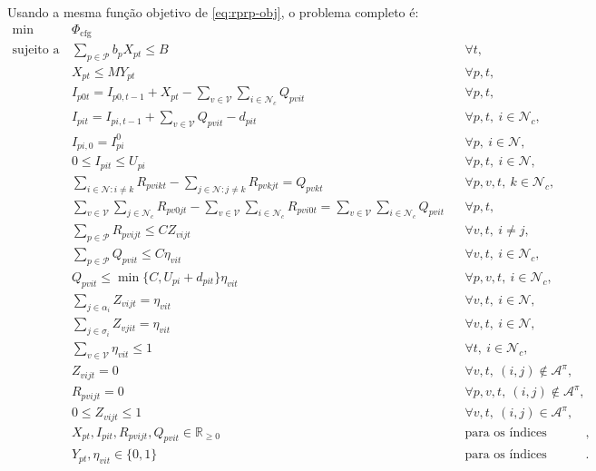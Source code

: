 \documentclass[11pt,a4paper]{article}
\newcommand{\N}{\mathcal{N}}
\newcommand{\Pset}{\mathcal{P}}
\newcommand{\Vset}{\mathcal{V}}
\newcommand{\A}{\mathcal{A}}
\begin{document}
Usando a mesma função objetivo de \eqref{eq:rprp-obj}, o problema completo é:
\begingroup
\allowdisplaybreaks[1]
\begin{align}
 \min\quad &\Phi_{\mathrm{cfg}} \label{eq:restricted-complete-obj}\\
 \text{sujeito a}\quad
 &\sum_{p\in\Pset}b_pX_{pt}\le B &&\forall t,
 \label{eq:restricted-complete-production}\\
 &X_{pt}\le MY_{pt} &&\forall p,t,
 \label{eq:restricted-complete-setup}\\
 &I_{p0t}=I_{p0,t-1}+X_{pt}-\sum_{v\in\Vset}\sum_{i\in\N_c}Q_{pvit}
 &&\forall p,t,
 \label{eq:restricted-complete-plant-stock}\\
 &I_{pit}=I_{pi,t-1}+\sum_{v\in\Vset}Q_{pvit}-d_{pit}
 &&\forall p,t,\ i\in\N_c,
 \label{eq:restricted-complete-customer-stock}\\
 &I_{pi,0}=I^0_{pi} &&\forall p,\ i\in\N,
 \label{eq:restricted-complete-initial-stock}\\
 &0\le I_{pit}\le U_{pi} &&\forall p,t,\ i\in\N,
 \label{eq:restricted-complete-stock-capacity}\\
 &\sum_{i\in\N:i\ne k}R_{pvikt}-\sum_{j\in\N:j\ne k}R_{pvkjt}=Q_{pvkt}
 &&\forall p,v,t,\ k\in\N_c,
 \label{eq:restricted-complete-customer-flow}\\
 &\sum_{v\in\Vset}\sum_{j\in\N_c}R_{pv0jt}
 -\sum_{v\in\Vset}\sum_{i\in\N_c}R_{pvi0t}
 =\sum_{v\in\Vset}\sum_{i\in\N_c}Q_{pvit}
 &&\forall p,t,
 \label{eq:restricted-complete-plant-flow}\\
 &\sum_{p\in\Pset}R_{pvijt}\le CZ_{vijt}
 &&\forall v,t,\ i\ne j,
 \label{eq:restricted-complete-load-capacity}\\
 &\sum_{p\in\Pset}Q_{pvit}\le C\eta_{vit}
 &&\forall v,t,\ i\in\N_c,
 \label{eq:restricted-complete-delivery-capacity}\\
 &Q_{pvit}\le \min\{C,U_{pi}+d_{pit}\}\eta_{vit}
 &&\forall p,v,t,\ i\in\N_c,
 \label{eq:restricted-complete-delivery-bound}\\
 &\sum_{j\in\alpha_i}Z_{vijt}=\eta_{vit}
 &&\forall v,t,\ i\in\N,
 \label{eq:restricted-complete-out-degree}\\
 &\sum_{j\in\sigma_i}Z_{vjit}=\eta_{vit}
 &&\forall v,t,\ i\in\N,
 \label{eq:restricted-complete-in-degree}\\
 &\sum_{v\in\Vset}\eta_{vit}\le1
 &&\forall t,\ i\in\N_c,
 \label{eq:restricted-complete-assignment}\\
 &Z_{vijt}=0 &&\forall v,t,\ (i,j)\notin\A^\pi,
 \label{eq:restricted-complete-forbidden-arc}\\
 &R_{pvijt}=0 &&\forall p,v,t,\ (i,j)\notin\A^\pi,
 \label{eq:restricted-complete-forbidden-load}\\
 &0\le Z_{vijt}\le1 &&\forall v,t,\ (i,j)\in\A^\pi,
 \label{eq:restricted-complete-arc-domain}\\
 &X_{pt},I_{pit},R_{pvijt},Q_{pvit}\in\mathbb{R}_{\ge0}
 &&\text{para os índices válidos},
 \label{eq:restricted-complete-continuous-domain}\\
 &Y_{pt},\eta_{vit}\in\{0,1\}
 &&\text{para os índices válidos}.
 \label{eq:restricted-complete-binary-domain}
\end{align}
\endgroup
\end{document}
